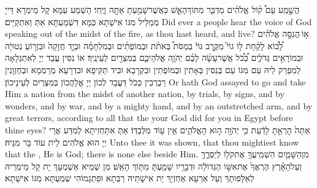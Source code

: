 {הֲשָׁ֣מַֽע עָם֩ ק֨וֹל אֱלֹהִ֜ים מְדַבֵּ֧ר מִתּוֹךְ\maqqaf הָאֵ֛שׁ כַּאֲשֶׁר\maqqaf שָׁמַ֥עְתָּ אַתָּ֖ה וַיֶּֽחִי׃}
{הַשְׁמַע עַמָּא קָל מֵימְרָא דַּייָ מְמַלֵּיל מִגּוֹ אִישָׁתָא כְּמָא דִּשְׁמַעְתָּא אַתְּ וְאִתְקַיַּים׃}
{Did ever a people hear the voice of God speaking out of the midst of the fire, as thou hast heard, and live?}{}
{א֣וֹ \legarmeh  הֲנִסָּ֣ה אֱלֹהִ֗ים לָ֠ב֠וֹא לָקַ֨חַת ל֣וֹ גוֹי֮ מִקֶּ֣רֶב גּוֹי֒ בְּמַסֹּת֩ בְּאֹתֹ֨ת וּבְמוֹפְתִ֜ים וּבְמִלְחָמָ֗ה וּבְיָ֤ד חֲזָקָה֙ וּבִזְר֣וֹעַ נְטוּיָ֔ה וּבְמוֹרָאִ֖ים גְּדֹלִ֑ים כְּ֠כֹ֠ל אֲשֶׁר\maqqaf עָשָׂ֨ה לָכֶ֜ם יְהֹוָ֧ה אֱלֹהֵיכֶ֛ם בְּמִצְרַ֖יִם לְעֵינֶֽיךָ׃}
{אוֹ נִסִּין עֲבַד יְיָ לְאִתְגְּלָאָה לְמִפְרַק לֵיהּ עַם מִגּוֹ עַם בְּנִסִּין בְּאָתִין וּבְמוֹפְתִין וּבִקְרָבָא וּבִיד תַּקִּיפָא וּבִדְרָעָא מְרָמְמָא וּבְחֶזְוָנִין רַבְרְבִין כְּכֹל דַּעֲבַד לְכוֹן יְיָ אֱלָהֲכוֹן בְּמִצְרַיִם לְעֵינֵיכוֹן׃}
{Or hath God assayed to go and take Him a nation from the midst of another nation, by trials, by signs, and by wonders, and by war, and by a mighty hand, and by an outstretched arm, and by great terrors, according to all that the \lord\space your God did for you in Egypt before thine eyes?}{}
{אַתָּה֙ הׇרְאֵ֣תָ לָדַ֔עַת כִּ֥י יְהֹוָ֖ה ה֣וּא הָאֱלֹהִ֑ים אֵ֥ין ע֖וֹד מִלְּבַדּֽוֹ׃}
{אַתְּ אִתַּחְזִיתָא לְמִדַּע אֲרֵי יְיָ הוּא אֱלֹהִים לֵית עוֹד בָּר מִנֵּיהּ׃}
{Unto thee it was shown, that thou mightiest know that the \lord, He is God; there is none else beside Him.}{}
{מִן\maqqaf הַשָּׁמַ֛יִם הִשְׁמִֽיעֲךָ֥ אֶת\maqqaf קֹל֖וֹ לְיַסְּרֶ֑ךָּ וְעַל\maqqaf הָאָ֗רֶץ הֶרְאֲךָ֙ אֶת\maqqaf אִשּׁ֣וֹ הַגְּדוֹלָ֔ה וּדְבָרָ֥יו שָׁמַ֖עְתָּ מִתּ֥וֹךְ הָאֵֽשׁ׃}
{מִן שְׁמַיּא אַשְׁמְעָךְ יָת קָל מֵימְרֵיהּ לְאַלָּפוּתָךְ וְעַל אַרְעָא אַחְזְיָךְ יָת אִישָׁתֵיהּ רַבְּתָא וּפִתְגָמוֹהִי שְׁמַעְתָּא מִגּוֹ אִישָׁתָא׃}
